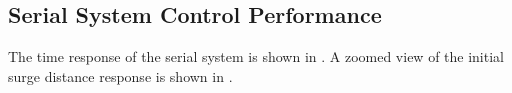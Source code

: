 \subsection{Serial System Control Performance}

The time response of the serial system is shown in .
A zoomed view of the initial surge distance response is shown in .



